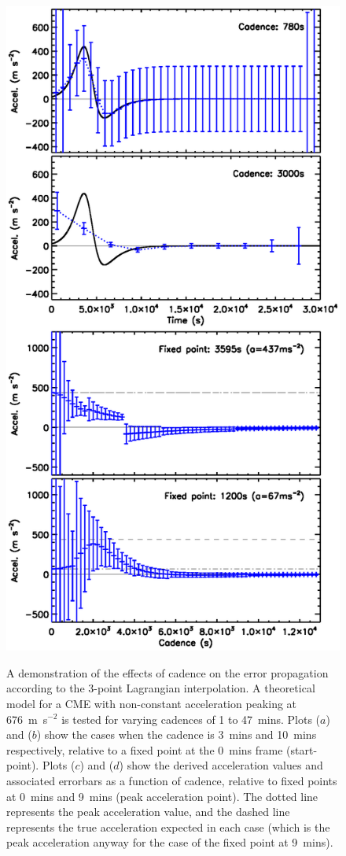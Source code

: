 \documentclass[preprint2]{aastex}
\begin{document}
\begin{figure}[ht]
\centering
{\includegraphics[scale=0.55, trim=15 50 0 40, clip=true]{images/fig_cadence_4.eps}}
\caption{A demonstration of the effects of cadence on the error propagation according to the 3-point Lagrangian interpolation. A theoretical model for a CME with non-constant acceleration peaking at 676~m~s$^{-2}$ is tested for varying cadences of 1 to 47~mins. Plots ($a$) and ($b$) show the cases when the cadence is 3~mins and 10~mins respectively, relative to a fixed point at the 0~mins frame (start-point). Plots ($c$) and ($d$) show the derived acceleration values and associated errorbars as a function of cadence, relative to fixed points at 0~mins and 9~mins (peak acceleration point). The dotted line represents the peak acceleration value, and the dashed line represents the true acceleration expected in each case (which is the peak acceleration anyway for the case of the fixed point at 9~mins).}
\label{fig_cadence_4}
\end{figure}
\end{document}
